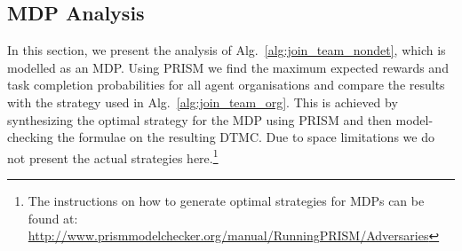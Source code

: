 \documentclass{llncs}
\begin{document}
\subsection{MDP Analysis}
\label{subsec:MDP}
In this section, we present the analysis of Alg.~\ref{alg:join_team_nondet}, which is modelled as an MDP. Using PRISM we find the maximum expected rewards and task completion probabilities for all agent organisations and compare the results with the strategy used in Alg.~\ref{alg:join_team_org}. This is achieved by synthesizing the optimal strategy for the MDP using PRISM and then model-checking the formulae on the resulting DTMC. Due to space limitations we do not present the actual strategies here.\footnote{The instructions on how to generate optimal strategies for MDPs can be found at:\\ {\scriptsize\url{http://www.prismmodelchecker.org/manual/RunningPRISM/Adversaries}}}
\begin{table}[t]
\centering
{}
\caption{Maximum task completion probabilities for optimal agent organisations using Alg.~\ref{alg:join_team_nondet}'s online and offline versions (see Alg.~\ref{alg:main_process}).}
\label{tab:mdp_probs}
\end{table}
\end{document}
